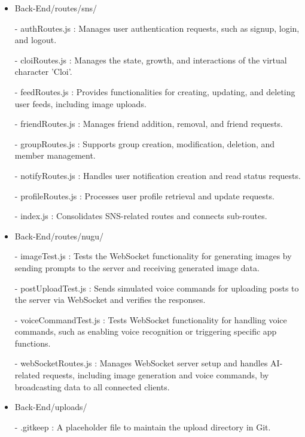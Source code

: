 \begin{itemize}
                    \item Back-End/routes/sns/
                        \item[-] authRoutes.js : Manages user authentication requests, such as signup, login, and logout.
                        \item[-] cloiRoutes.js : Manages the state, growth, and interactions of the virtual character 'Cloi'.
                        \item[-] feedRoutes.js : Provides functionalities for creating, updating, and deleting user feeds, including image uploads.
                        \item[-] friendRoutes.js : Manages friend addition, removal, and friend requests.
                        \item[-] groupRoutes.js : Supports group creation, modification, deletion, and member management.
                        \item[-] notifyRoutes.js : Handles user notification creation and read status requests.
                        \item[-] profileRoutes.js : Processes user profile retrieval and update requests.
                        \item[-] index.js : Consolidates SNS-related routes and connects sub-routes.
                    \vspace{3mm}

                    \item Back-End/routes/nugu/
                        \item[-] imageTest.js : Tests the WebSocket functionality for generating images by sending prompts to the server and receiving generated image data.
                        \item[-] postUploadTest.js : Sends simulated voice commands for uploading posts to the server via WebSocket and verifies the responses.
                        \item[-] voiceCommandTest.js : Tests WebSocket functionality for handling voice commands, such as enabling voice recognition or triggering specific app functions.
                        \item[-] webSocketRoutes.js : Manages WebSocket server setup and handles AI-related requests, including image generation and voice commands, by broadcasting data to all connected clients.
                        \vspace{3mm}

                    
                    \item Back-End/uploads/
                        \item[-] .gitkeep : A placeholder file to maintain the upload directory in Git.
                    \vspace{3mm}
                    

\end{itemize}
